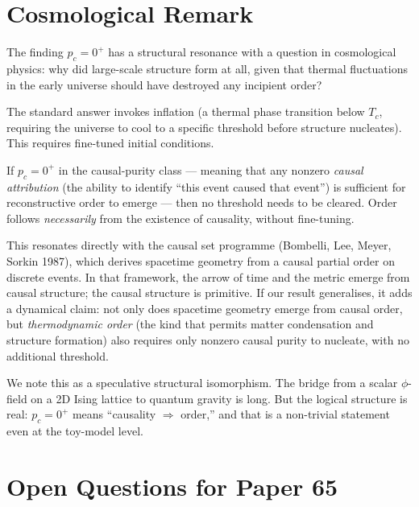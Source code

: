 \documentclass[12pt,a4paper]{article}
\begin{document}
\section{Cosmological Remark}

The finding $p_c = 0^+$ has a structural resonance with a question in
cosmological physics: why did large-scale structure form at all,
given that thermal fluctuations in the early universe should have
destroyed any incipient order?

The standard answer invokes inflation (a thermal phase transition below $T_c$,
requiring the universe to cool to a specific threshold before structure nucleates).
This requires fine-tuned initial conditions.

If $p_c = 0^+$ in the causal-purity class --- meaning that any nonzero
\emph{causal attribution} (the ability to identify ``this event caused that event'')
is sufficient for reconstructive order to emerge --- then no threshold needs
to be cleared.
Order follows \emph{necessarily} from the existence of causality,
without fine-tuning.

This resonates directly with the causal set programme
(Bombelli, Lee, Meyer, Sorkin 1987), which derives spacetime geometry
from a causal partial order on discrete events.
In that framework, the arrow of time and the metric emerge from
causal structure; the causal structure is primitive.
If our result generalises, it adds a dynamical claim:
not only does spacetime geometry emerge from causal order,
but \emph{thermodynamic order} (the kind that permits matter condensation
and structure formation) also requires only nonzero causal purity to nucleate,
with no additional threshold.

We note this as a speculative structural isomorphism.
The bridge from a scalar $\phi$-field on a 2D Ising lattice
to quantum gravity is long.
But the logical structure is real:
$p_c = 0^+$ means ``causality $\Rightarrow$ order,''
and that is a non-trivial statement even at the toy-model level.

\section{Open Questions for Paper 65}
\end{document}
